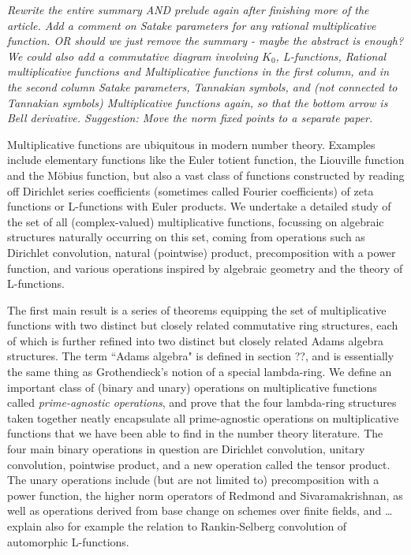 \documentclass[a4paper]{article}
\begin{document}
\emph{Rewrite the entire summary AND prelude again after finishing more of the article. Add a comment on Satake parameters for any rational multiplicative function. OR should we just remove the summary - maybe the abstract is enough? We could also add a commutative diagram involving $K_0$, L-functions, Rational multiplicative functions and Multiplicative functions in the first column, and in the second column Satake parameters, Tannakian symbols, and (not connected to Tannakian symbols) Multiplicative functions again, so that the bottom arrow is Bell derivative. Suggestion: Move the norm fixed points to a separate paper.}

Multiplicative functions are ubiquitous in modern number theory. Examples include elementary functions like the Euler totient function, the Liouville function and the M\"obius function, but also a vast class of functions constructed by reading off Dirichlet series coefficients (sometimes called Fourier coefficients) of zeta functions or L-functions with Euler products. We undertake a detailed study of the set of all (complex-valued) multiplicative functions, focussing on algebraic structures naturally occurring on this set, coming from operations such as Dirichlet convolution, natural (pointwise) product, precomposition with a power function, and various operations inspired by algebraic geometry and the theory of L-functions. 

The first main result is a series of theorems equipping the set of multiplicative functions with two distinct but closely related commutative ring structures, each of which is further refined into two distinct but closely related Adams algebra structures. The term ``Adams algebra" is defined in section ??, and is essentially the same thing as Grothendieck's notion of a special lambda-ring. We define an important class of (binary and unary) operations on multiplicative functions called \emph{prime-agnostic operations}, and prove that the four lambda-ring structures taken together neatly encapsulate all prime-agnostic operations on multiplicative functions that we have been able to find in the number theory literature. The four main binary operations in question are Dirichlet convolution, unitary convolution, pointwise product, and a new operation called the tensor product. The unary operations include (but are not limited to) precomposition with a power function, the higher norm operators of Redmond and Sivaramakrishnan, as well as operations derived from base change on schemes over finite fields, and \ldots explain also for example the relation to Rankin-Selberg convolution of automorphic L-functions.
\end{document}
